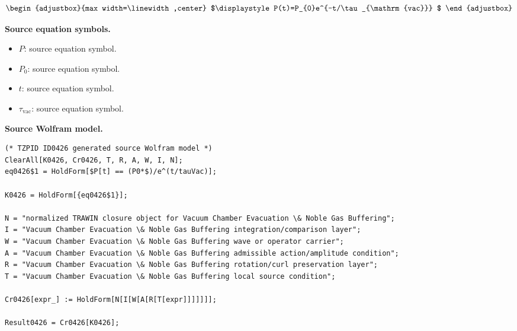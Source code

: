 \[
\begin{adjustbox}{max width=\linewidth,center}
$\displaystyle
P(t)=P_{0}e^{-t/\tau_{\mathrm{vac}}}
$
\end{adjustbox}
\]

\begin{minipage}[t]{0.49\linewidth}
\begingroup
\small
\raggedright
\textbf{Source equation symbols.}\par
\begin{itemize}[leftmargin=1.35em,itemsep=1pt,topsep=1pt,parsep=0pt]
    \item $P$: source equation symbol.
    \item $P_{0}$: source equation symbol.
    \item $t$: source equation symbol.
    \item $\tau_{\mathrm{vac}}$: source equation symbol.
\end{itemize}
\endgroup
\end{minipage}\hfill
\begin{minipage}[t]{0.47\linewidth}
\begingroup
\scriptsize
\raggedright
\textbf{Source Wolfram model.}\par
\begin{Verbatim}[fontsize=\tiny,breaklines=true,breakanywhere=true]
(* TZPID ID0426 generated source Wolfram model *)
ClearAll[K0426, Cr0426, T, R, A, W, I, N];
eq0426$1 = HoldForm[$P[t] == (P0*$)/e^(t/tauVac)];

K0426 = HoldForm[{eq0426$1}];

N = "normalized TRAWIN closure object for Vacuum Chamber Evacuation \& Noble Gas Buffering";
I = "Vacuum Chamber Evacuation \& Noble Gas Buffering integration/comparison layer";
W = "Vacuum Chamber Evacuation \& Noble Gas Buffering wave or operator carrier";
A = "Vacuum Chamber Evacuation \& Noble Gas Buffering admissible action/amplitude condition";
R = "Vacuum Chamber Evacuation \& Noble Gas Buffering rotation/curl preservation layer";
T = "Vacuum Chamber Evacuation \& Noble Gas Buffering local source condition";

Cr0426[expr_] := HoldForm[N[I[W[A[R[T[expr]]]]]]];

Result0426 = Cr0426[K0426];
\end{Verbatim}
\endgroup
\end{minipage}

